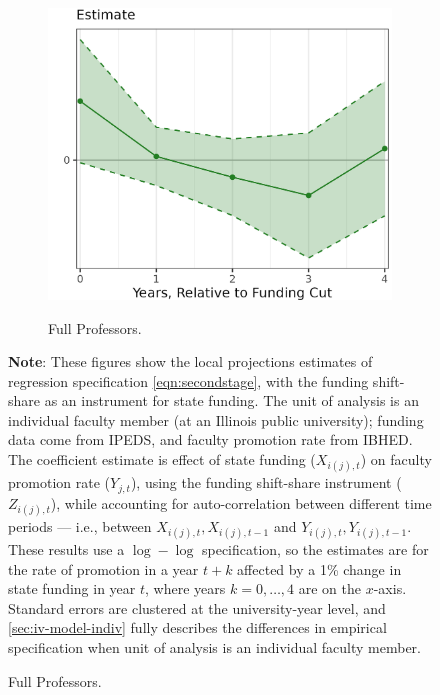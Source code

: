 \begin{figure}[H]
\begin{subfigure}[b]{0.495\textwidth}
        \label{fig:promoted-assistant-illinois-lp-rolling}
    \end{subfigure}
    \begin{subfigure}[b]{0.495\textwidth}
        \centering
        \caption{Full Professors.}
        \includegraphics[width=\textwidth]{figures/promoted-full-illinois-lp-rolling.png}
        \label{fig:promoted-full-illinois-lp-rolling}
    \end{subfigure}
    \label{fig:promoted-illinois-lp-rolling}
    \justify
    \footnotesize
    \textbf{Note}:
    These figures show the local projections estimates of regression specification \eqref{eqn:secondstage}, with the funding shift-share as an instrument for state funding.
    The unit of analysis is an individual faculty member (at an Illinois public university); funding data come from IPEDS, and faculty promotion rate from IBHED.
    The coefficient estimate is effect of state funding ($X_{i(j),t}$) on faculty promotion rate ($Y_{j,t}$), using the funding shift-share instrument ($Z_{i(j),t}$), while accounting for auto-correlation between different time periods --- i.e., between $X_{i(j),t}, X_{i(j),t-1}$ and $Y_{i(j),t}, Y_{i(j),t-1}$.
    These results use a $\log-\log$ specification, so the estimates are for the rate of promotion in a year $t+k$ affected by a 1\% change in state funding in year $t$, where years $k = 0, \hdots, 4$ are on the $x$-axis. 
    Standard errors are clustered at the university-year level, and \autoref{sec:iv-model-indiv} fully describes the differences in empirical specification when unit of analysis is an individual faculty member.
\end{figure}

